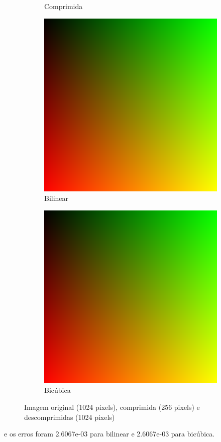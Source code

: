 \documentclass{article}
\begin{document}
\begin{figure}[ht]
\begin{subfigure}{0.23\textwidth}
    \caption{Comprimida}
  \end{subfigure}%
  \hfill
  \begin{subfigure}{0.23\textwidth}
    \centering
    \includegraphics[width=\textwidth]{gradiente/decompressed-bilinear.png}
    \caption{Bilinear}
  \end{subfigure}%
  \hfill
  \begin{subfigure}{0.23\textwidth}
    \centering
    \includegraphics[width=\textwidth]{gradiente/decompressed-bicubica.png}
    \caption{Bicúbica}
  \end{subfigure}
  \caption{Imagem original (1024 pixels), comprimida (256 pixels) e descomprimidas (1024 pixels)}
\end{figure}
e os erros foram 2.6067e-03 para bilinear e 2.6067e-03 para bicúbica.
\end{document}
